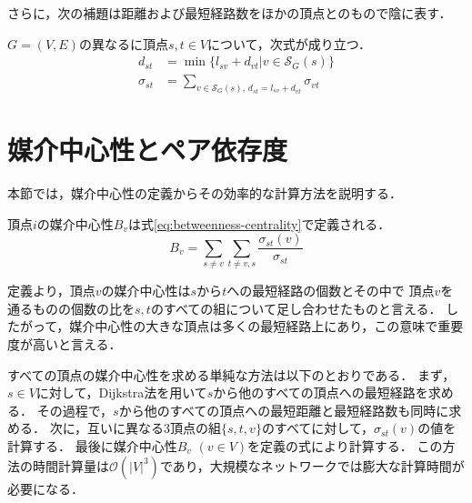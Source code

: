 さらに，次の補題は距離および最短経路数をほかの頂点とのもので陰に表す．

\begin{lemma}
  \label{lemma:distance-and-geodesics}
  $G=(V,E)$の異なるに頂点$s,t\in V$について，次式が成り立つ．
  \begin{equation*}
    \begin{aligned}
      d_{st}&=\min\{l_{sv}+d_{vt}|v\in\mathcal{S}_G(s)\} \\
      \sigma_{st}&=\sum_{v\in\mathcal{S}_G(s),\,d_{st}=l_{sv}+d_{vt}}\sigma_{vt}
    \end{aligned}
  \end{equation*}
\end{lemma}
%

\section{媒介中心性とペア依存度}
\label{sect:pairwise-dependency}

本節では，媒介中心性の定義からその効率的な計算方法を説明する．

\begin{definition}
  \label{def:betweenness-centrality}
  頂点$i$の媒介中心性$B_v$は式\eqref{eq:betweenness-centrality}で定義される．
  \begin{equation}
    B_v=\sum_{s\neq v}\sum_{t\neq {v,s}}\frac{\sigma_{st}(v)}{\sigma_{st}}
    \label{eq:betweenness-centrality}
  \end{equation}
\end{definition}

定義より，頂点$v$の媒介中心性は$s$から$t$への最短経路の個数とその中で
頂点$v$を通るものの個数の比を$s,t$のすべての組について足し合わせたものと言える．
したがって，媒介中心性の大きな頂点は多くの最短経路上にあり，この意味で重要度が高いと言える．

すべての頂点の媒介中心性を求める単純な方法は以下のとおりである．
まず，$s\in V$に対して，Dijkstra法を用いて$s$から他のすべての頂点への最短経路を求める．
その過程で，$s$から他のすべての頂点への最短距離と最短経路数も同時に求める．
次に，互いに異なる3頂点の組$\{s,t,v\}$のすべてに対して，$\sigma_{st}(v)$の値を計算する．
最後に媒介中心性$B_v$ $(v\in V)$を定義の式により計算する．
この方法の時間計算量は$\mathcal{O}(|V|^3)$であり，大規模なネットワークでは膨大な計算時間が必要になる．

